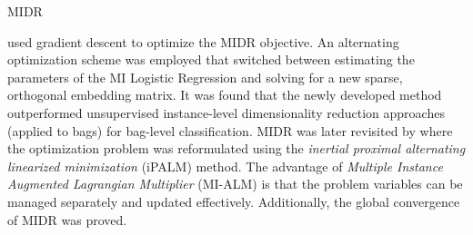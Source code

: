 \begin{algorithm}[h!]
	\caption{MIDR}
	\label{alg:MIDR}
	\begin{algorithmic}[1]
		\EndFor
		\EndWhile            
	\end{algorithmic}
\end{algorithm}

\cite{Sun2010MIDR} used gradient descent to optimize the MIDR objective.  An alternating optimization scheme was employed that switched between estimating the parameters of the MI Logistic Regression and solving for a new sparse, orthogonal embedding  matrix.  It was found that the newly developed method outperformed unsupervised instance-level dimensionality reduction approaches (applied to bags) for bag-level classification.  MIDR was later revisited by \cite{Zhu2018MIDRSparsity} where the optimization problem was reformulated using the \textit{inertial proximal alternating linearized minimization} (iPALM) method.  The advantage of \textit{Multiple Instance Augmented Lagrangian Multiplier} (MI-ALM) \citep{Zhu2018MIDRSparsity} is that the problem variables can be managed separately and updated effectively.  Additionally, the global convergence of MIDR was proved. 

